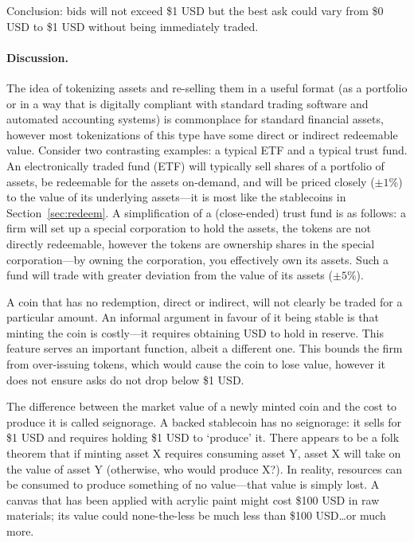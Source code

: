 Conclusion: bids will not exceed \$1 USD but the best ask could vary from \$0 USD to \$1 USD without being immediately traded.

\paragraph{Discussion.} The idea of tokenizing assets and re-selling them in a useful format (\eg as a portfolio or in a way that is digitally compliant with standard trading software and automated accounting systems) is commonplace for standard financial assets, however most tokenizations of this type have some direct or indirect redeemable value. Consider two contrasting examples: a typical ETF and a typical trust fund. An electronically traded fund (ETF) will typically sell shares of a portfolio of assets, be redeemable for the assets on-demand, and will be priced closely ($\pm 1\%$) to the value of its underlying assets---it is most like the stablecoins in Section~\ref{sec:redeem}. A simplification of a (close-ended) trust fund is as follows: a firm will set up a special corporation to hold the assets, the tokens are not directly redeemable, however the tokens are ownership shares in the special corporation---by owning the corporation, you effectively own its assets. Such a fund will trade with greater deviation from the value of its assets ($\pm 5\%$).


A coin that has no redemption, direct or indirect, will not clearly be traded for a particular amount. An informal argument in favour of it being stable is that minting the coin is costly---it requires obtaining USD to hold in reserve. This feature serves an important function, albeit a different one. This bounds the firm from over-issuing tokens, which would cause the coin to lose value, however it does not ensure asks do not drop below \$1 USD.

The difference between the market value of a newly minted coin and the cost to produce it is called seignorage. A backed stablecoin has no seignorage: it sells for \$1 USD and requires holding \$1 USD to `produce' it. There appears to be a folk theorem that if minting asset X requires consuming asset Y, asset X will take on the value of asset Y (otherwise, who would produce X?). In reality, resources can be consumed to produce something of no value---that value is simply lost. A canvas that has been applied with acrylic paint might cost \$100 USD in raw materials; its value could none-the-less be much less than \$100 USD\ldots or much more.

